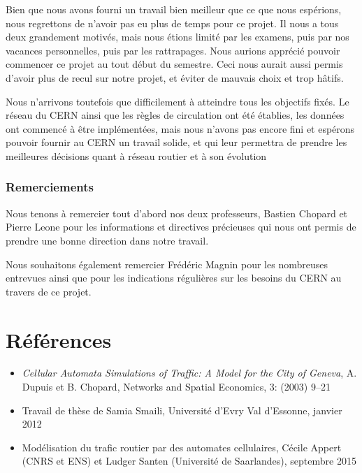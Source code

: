 \documentclass[a4paper,11pt, titlepage]{extarticle}
\begin{document}
Bien que nous avons fourni un travail bien meilleur que ce que nous espérions, nous regrettons de n'avoir pas eu plus de temps pour ce projet. Il nous a tous deux grandement motivés, mais nous étions limité par les examens, puis par nos vacances personnelles, puis par les rattrapages. Nous aurions apprécié pouvoir commencer ce projet au tout début du semestre. Ceci nous aurait aussi permis d'avoir plus de recul sur notre projet, et éviter de mauvais choix et trop hâtifs.

Nous n'arrivons toutefois que difficilement à atteindre tous les objectifs fixés. Le réseau du CERN ainsi que les règles de circulation ont été établies, les données ont commencé à être implémentées, mais nous n'avons pas encore fini et espérons pouvoir fournir au CERN un travail solide, et qui leur permettra de prendre les meilleures décisions quant à réseau routier et à son évolution

\vspace{2.5cm}

\subsubsection*{Remerciements}

Nous tenons à remercier tout d'abord nos deux professeurs, Bastien Chopard et Pierre Leone pour les informations et directives précieuses qui nous ont permis de prendre une bonne direction dans notre travail.

\vspace{0.2cm}

Nous souhaitons également remercier Frédéric Magnin pour les nombreuses entrevues ainsi que pour les indications régulières sur les besoins du CERN au travers de ce projet.

\newpage

\appendix

\section{Références}

\begin{itemize}
\item \emph{Cellular Automata Simulations of Traffic: A Model for the City of Geneva}, A. Dupuis et B. Chopard, Networks and Spatial Economics, 3: (2003) 9–21
\item Travail de thèse de Samia Smaili, Université d'Evry Val d'Essonne, janvier 2012
\item Modélisation du trafic routier par des automates cellulaires, Cécile Appert (CNRS et ENS) et Ludger Santen (Université de Saarlandes), septembre 2015
\end{itemize}
\end{document}
